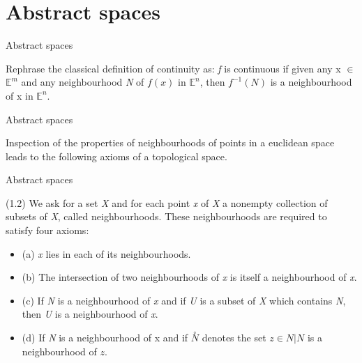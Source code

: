\documentclass{beamer}
\begin{document}
\section{Abstract spaces}

\begin{frame}{Abstract spaces}
  \begin{block}{}
    Rephrase the classical definition of continuity as: \textsl{f} is continuous if given any x $\in$ $\mathbb{E}^m$ and any neighbourhood \textsl{N} of $f(x)$ in $\mathbb{E}^n$, then $f^{-1}(N)$ is a neighbourhood of x in $\mathbb{E}^n$.
  \end{block}
\end{frame}

\begin{frame}{Abstract spaces}
  \begin{block}{}
    Inspection of the properties of neighbourhoods of points in a euclidean space leads to the following axioms of a topological space.
  \end{block}
\end{frame}

\begin{frame}{Abstract spaces}
  \begin{block}{}
    (1.2) We ask for a set \textsl{X} and for each point \textsl{x} of \textsl{X} a nonempty collection of subsets of \textsl{X}, called neighbourhoods. These neighbourhoods are required to satisfy four axioms:
    \begin{itemize}
    \item (a) \textsl{x} lies in each of its neighbourhoods.
    \item (b) The intersection of two neighbourhoods of \textsl{x} is itself a neighbourhood of \textsl{x}.
    \item (c) If \textsl{N} is a neighbourhood of \textsl{x} and if \textsl{U} is a subset of \textsl{X} which contains \textsl{N}, then \textsl{U} is a neighbourhood of \textsl{x}.
    \item (d) If \textsl{N} is a neighbourhood of x and if $\overset{\circ}{N}$ denotes the set {{$z \in N|N$ is a neighbourhood of $z$}}.
    \end{itemize}
  \end{block}
\end{frame}
\end{document}
